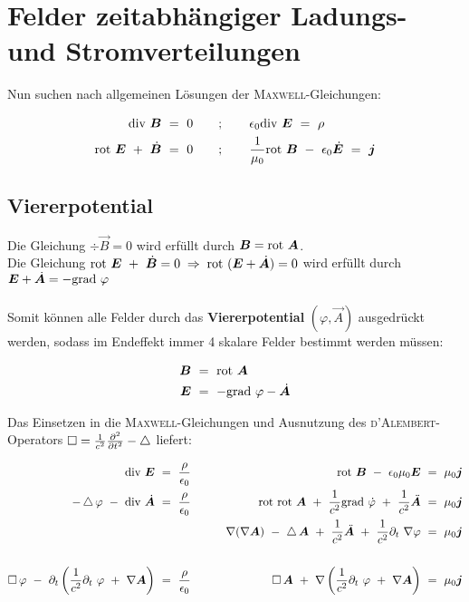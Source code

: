 \chapter{Felder zeitabhängiger Ladungs- und Stromverteilungen}

Nun suchen nach allgemeinen Lösungen der \textsc{Maxwell}-Gleichungen:

\begin{align*}
\div \vec{B}  \ &= \ 0 \qquad ; \qquad \epsilon_0 \div\vec{E}  \ = \ \rho\\
\rot\vec{E} \ + \ \dot{\vec{B}} \ &= \ 0 \qquad ; \qquad \frac{1}{\mu_0}\rot\vec{B}\ - \ \epsilon_0\dot{\vec{E}}  \ = \ \vec{j}
\end{align*}

\section{Viererpotential}

Die Gleichung $\div \vec{B} = 0 $ wird erfüllt durch $\bm{B}=\text{rot }\bm{A}$.\\
Die Gleichung $\text{rot }\bm{E} \ + \ \dot{\bm{B}} = 0 \; \Rightarrow \; \text{rot } (\bm{E} + \dot{\bm{A}}) =0$ wird erfüllt durch $\bm{E} + \dot{\bm{A}}= - \text{grad }\varphi$\\
\ \\
Somit können alle Felder durch das \textbf{Viererpotential} $(\varphi,\vec{A})$ ausgedrückt werden, sodass im Endeffekt immer 4 skalare Felder bestimmt werden müssen:

\begin{align*}
\bm{B} \ &= \ \text{rot } \bm{A}\\
\bm{E} \ &= \ - \text{grad } \varphi - \dot{\bm{A}}
\end{align*}

Das Einsetzen in die \textsc{Maxwell}-Gleichungen und Ausnutzung des \textsc{d'Alembert}-Operators  $\mathop{{}\Box}\nolimits  =  \frac{1}{c^2}\frac{\partial ^2{}}{\partial{t}^2} - \mathop{{}\bigtriangleup}\nolimits$ liefert:

\begin{align*}
\div\vec{E}  \ &= \  \frac{\rho}{\epsilon_0} \qquad  & \rot \vec{B} \ - \ \epsilon_0\mu_0\vec{E}  \ = \ \mu_0\vec{j}\\
-\laplace\varphi \ - \ \div\dot{\vec{A}}  \ &= \ \frac{\rho}{\epsilon_0}	\qquad	& \rot\rot\vec{A} \ + \ \frac{1}{c^2}\grad\dot{\varphi} \ + \ \frac{1}{c^2} \ddot{\vec{A}}  \ = \ \mu_0\vec{j}\\
&& \nabla(\nabla\vec{A}) \ - \ \laplace\vec{A} \ + \ \frac{1}{c^2}\ddot{\vec{A}} \ + \ \frac{1}{c^2}\partial_t \ \nabla\varphi  \ = \ \mu_0\vec{j}\\
\ \\
\Dalembert\varphi  \ - \ \partial_t\left(\frac{1}{c^2}\partial_t\ \varphi \ + \ \nabla\vec{A}\right)  \ &= \ \frac{\rho}{\epsilon_0}  \qquad &
\Dalembert\vec{A} \ + \ \nabla\left(\frac{1}{c^2} \partial_t \ \varphi \ + \ \nabla\vec{A}\right) \ = \ \mu_0\vec{j}
\end{align*}

